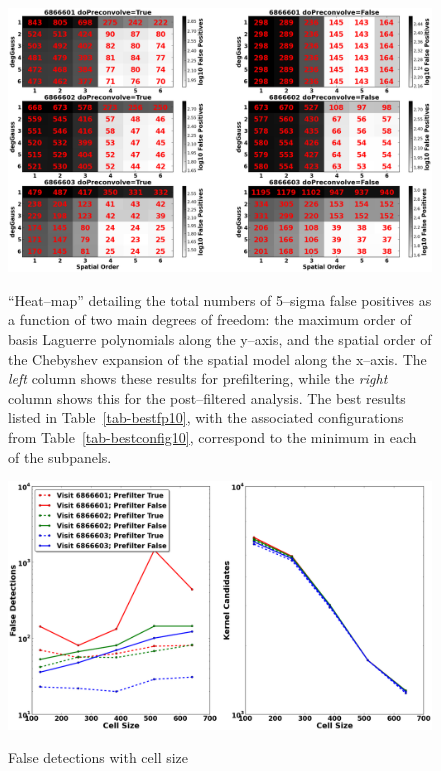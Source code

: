 \documentclass[prd, nofootinbib, floatfix, 11pt,tightenlines,times]{article}
\begin{document}
\begin{figure}
\includegraphics[width=1.0\textwidth]{figures/heatmap10.eps} \\
\caption{``Heat--map'' detailing the total numbers of 5--sigma false
  positives as a function of two main degrees of freedom: the maximum
  order of basis Laguerre polynomials along the y--axis, and the
  spatial order of the Chebyshev expansion of the spatial model along
  the x--axis.  The {\it left} column shows these results for
  prefiltering, while the {\it right} column shows this for the
  post--filtered analysis.  The best results listed in
  Table~\ref{tab-bestfp10}, with the associated configurations from
  Table~\ref{tab-bestconfig10}, correspond to the minimum in each of the
  subpanels.  }
\label{fp_heatmap}
\end{figure}

\begin{figure}
\includegraphics[width=1.0\textwidth]{figures/cellsize.eps} \\
\caption{False detections with cell size
}
\label{cellsize}
\end{figure}
\end{document}
